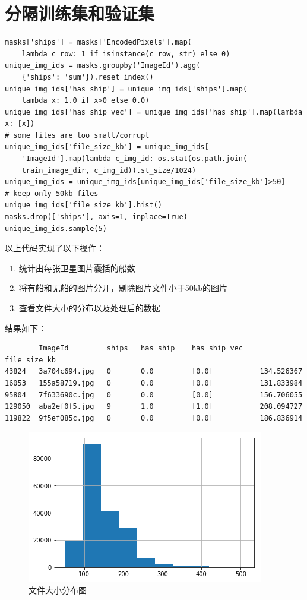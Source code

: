\section{分隔训练集和验证集}

\begin{lstlisting}
masks['ships'] = masks['EncodedPixels'].map(
    lambda c_row: 1 if isinstance(c_row, str) else 0)
unique_img_ids = masks.groupby('ImageId').agg(
    {'ships': 'sum'}).reset_index()
unique_img_ids['has_ship'] = unique_img_ids['ships'].map(
    lambda x: 1.0 if x>0 else 0.0)
unique_img_ids['has_ship_vec'] = unique_img_ids['has_ship'].map(lambda x: [x])
# some files are too small/corrupt
unique_img_ids['file_size_kb'] = unique_img_ids[
    'ImageId'].map(lambda c_img_id: os.stat(os.path.join(
    train_image_dir, c_img_id)).st_size/1024)
unique_img_ids = unique_img_ids[unique_img_ids['file_size_kb']>50]
# keep only 50kb files
unique_img_ids['file_size_kb'].hist()
masks.drop(['ships'], axis=1, inplace=True)
unique_img_ids.sample(5)
\end{lstlisting}

以上代码实现了以下操作：

\begin{enumerate}
\def\labelenumi{\arabic{enumi}.}
\tightlist
\item
  统计出每张卫星图片囊括的船数
\item
  将有船和无船的图片分开，剔除图片文件小于50kb的图片
\item
  查看文件大小的分布以及处理后的数据
\end{enumerate}

结果如下：

\begin{verbatim}
        ImageId         ships   has_ship    has_ship_vec    file_size_kb
43824   3a704c694.jpg   0       0.0         [0.0]           134.526367
16053   155a58719.jpg   0       0.0         [0.0]           131.833984
95804   7f633690c.jpg   0       0.0         [0.0]           156.706055
129050  aba2ef0f5.jpg   9       1.0         [1.0]           208.094727
119822  9f5ef085c.jpg   0       0.0         [0.0]           186.836914
\end{verbatim}

\begin{figure}[htbp]
\centering
\includegraphics[width=0.7\linewidth]{body/preprocessing_pic/3}
\caption{文件大小分布图}
\label{fig::preprocessing3}
\end{figure}

